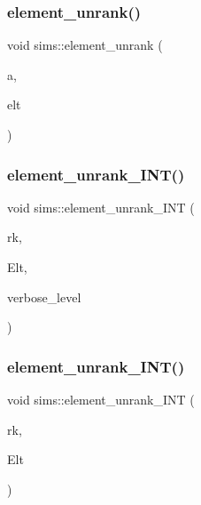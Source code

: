 \subsubsection{\texorpdfstring{element\+\_\+unrank()}{element\_unrank()}\hspace{0.1cm}{\footnotesize\ttfamily [2/2]}}
{\footnotesize\ttfamily void sims\+::element\+\_\+unrank (\begin{DoxyParamCaption}\item[{\mbox{\hyperlink{classlonginteger__object}{longinteger\+\_\+object}} \&}]{a,  }\item[{\mbox{\hyperlink{galois_8h_a09fddde158a3a20bd2dcadb609de11dc}{I\+NT}} $\ast$}]{elt }\end{DoxyParamCaption})}

\mbox{\label{classsims_a435d84bb7bf7292f14593b2a4344151f}} 
\subsubsection{\texorpdfstring{element\+\_\+unrank\+\_\+\+I\+N\+T()}{element\_unrank\_INT()}\hspace{0.1cm}{\footnotesize\ttfamily [1/2]}}
{\footnotesize\ttfamily void sims\+::element\+\_\+unrank\+\_\+\+I\+NT (\begin{DoxyParamCaption}\item[{\mbox{\hyperlink{galois_8h_a09fddde158a3a20bd2dcadb609de11dc}{I\+NT}}}]{rk,  }\item[{\mbox{\hyperlink{galois_8h_a09fddde158a3a20bd2dcadb609de11dc}{I\+NT}} $\ast$}]{Elt,  }\item[{\mbox{\hyperlink{galois_8h_a09fddde158a3a20bd2dcadb609de11dc}{I\+NT}}}]{verbose\+\_\+level }\end{DoxyParamCaption})}

\mbox{\label{classsims_aac07b378ca225ec7f6f992ad08f31869}} 
\subsubsection{\texorpdfstring{element\+\_\+unrank\+\_\+\+I\+N\+T()}{element\_unrank\_INT()}\hspace{0.1cm}{\footnotesize\ttfamily [2/2]}}
{\footnotesize\ttfamily void sims\+::element\+\_\+unrank\+\_\+\+I\+NT (\begin{DoxyParamCaption}\item[{\mbox{\hyperlink{galois_8h_a09fddde158a3a20bd2dcadb609de11dc}{I\+NT}}}]{rk,  }\item[{\mbox{\hyperlink{galois_8h_a09fddde158a3a20bd2dcadb609de11dc}{I\+NT}} $\ast$}]{Elt }\end{DoxyParamCaption})}

